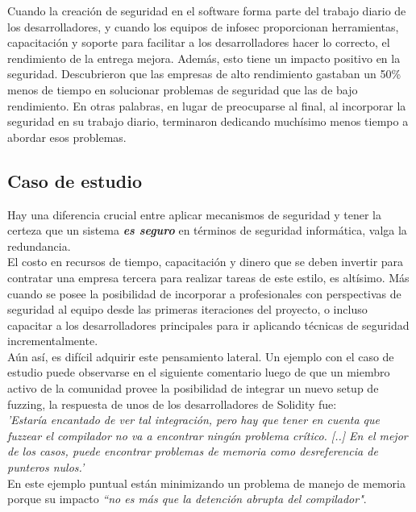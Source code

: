 \textsf{Cuando la creación de seguridad en el software forma parte del trabajo diario de los desarrolladores, y cuando los equipos de infosec proporcionan herramientas, capacitación y soporte para facilitar a los desarrolladores hacer lo correcto, el rendimiento de la entrega mejora. Además, esto tiene un impacto positivo en la seguridad. Descubrieron que las empresas de alto rendimiento gastaban un 50\% menos de tiempo en solucionar problemas de seguridad que las de bajo rendimiento. En otras palabras, en lugar de preocuparse al final, al incorporar la seguridad en su trabajo diario, terminaron dedicando muchísimo menos tiempo a abordar esos problemas.}

\subsection{Caso de estudio}
Hay una diferencia crucial entre aplicar mecanismos de seguridad y tener la certeza que un sistema \textit{\textbf{es seguro}} en términos de seguridad informática, valga la redundancia.\\

El costo en recursos de tiempo, capacitación y dinero que se deben invertir para contratar una empresa tercera para realizar tareas de este estilo, es altísimo. Más cuando se posee la posibilidad de incorporar a profesionales con perspectivas de seguridad al equipo desde las primeras iteraciones del proyecto, o incluso capacitar a los desarrolladores principales para ir aplicando técnicas de seguridad incrementalmente.\\

Aún así, es difícil adquirir este pensamiento lateral. Un ejemplo con el caso de estudio puede observarse en el siguiente comentario\cite{GHI5212:429777270} luego de que un miembro activo de la comunidad provee la posibilidad de integrar un nuevo setup de fuzzing, la respuesta de unos de los desarrolladores de Solidity fue:\\

\textit{'Estaría encantado de ver tal integración, pero hay que tener en cuenta que fuzzear el compilador no va a encontrar ningún problema crítico. [..] En el mejor de los casos, puede encontrar problemas de memoria como desreferencia de punteros nulos.'}\\

En este ejemplo puntual están minimizando un problema de manejo de memoria porque su impacto \textit{``no es más que la detención abrupta del compilador"}.\\

